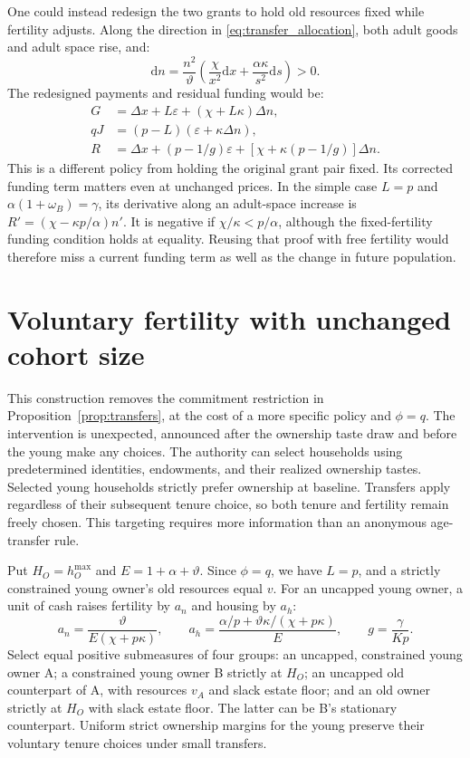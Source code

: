 \documentclass[11pt]{article}
\newcommand{\dd}{\mathrm d}
\begin{document}
One could instead redesign the two grants to hold old resources fixed
while fertility adjusts. Along the direction in
\eqref{eq:transfer_allocation}, both adult goods and adult space rise, and:
\begin{equation}
\dd n=\frac{n^2}{\vartheta}
\left(\frac\chi{x^2}\dd x+\frac{\alpha\kappa}{s^2}\dd s\right)>0.
\end{equation}
The redesigned payments and residual funding would be:
\begin{equation}
\begin{aligned}
G&=\Delta x+L\varepsilon+(\chi+L\kappa)\Delta n,\\
qJ&=(p-L)(\varepsilon+\kappa\Delta n),\\
R&=\Delta x+(p-1/g)\varepsilon+
 [\chi+\kappa(p-1/g)]\Delta n.
\end{aligned}
\label{eq:fertile_residual}
\end{equation}
This is a different policy from holding the original grant pair fixed.
Its corrected funding term matters even at unchanged prices. In the simple case $L=p$ and
$\alpha(1+\omega_B)=\gamma$, its derivative along an adult-space increase
is $R'=(\chi-\kappa p/\alpha)n'$. It is negative if
$\chi/\kappa<p/\alpha$, although the fixed-fertility funding condition
holds at equality. Reusing that proof with free fertility would therefore
miss a current funding term as well as the change in future population.

\section{Voluntary fertility with unchanged cohort size}
\label{app:free_choice}

This construction removes the commitment restriction in
Proposition~\ref{prop:transfers}, at the cost of a more specific policy and
$\phi=q$. The intervention is unexpected, announced after the ownership
taste draw and before the young make any choices. The authority can select
households using predetermined identities,
endowments, and their realized ownership tastes. Selected young households
strictly prefer ownership at baseline. Transfers apply regardless of their
subsequent tenure choice, so both tenure and fertility remain freely chosen.
This targeting requires more information than an anonymous age-transfer rule.

Put $H_O=h_O^{\max}$ and $E=1+\alpha+\vartheta$. Since $\phi=q$, we have
$L=p$, and a strictly constrained young owner's old resources equal $v$.
For an uncapped young owner, a unit of cash raises fertility by $a_n$ and
housing by $a_h$:
\begin{equation}
a_n=\frac{\vartheta}{E(\chi+p\kappa)},\qquad
a_h=\frac{\alpha/p+\vartheta\kappa/(\chi+p\kappa)}E,
\qquad g=\frac\gamma{Kp}.
\end{equation}
Select equal positive submeasures of four groups: an uncapped, constrained
young owner A; a constrained young owner B strictly at $H_O$; an uncapped
old counterpart of A, with resources $v_A$ and slack estate floor; and an
old owner strictly at $H_O$ with slack estate floor. The latter can be B's
stationary counterpart. Uniform strict ownership margins for the young
preserve their voluntary tenure choices under small transfers.
\end{document}
